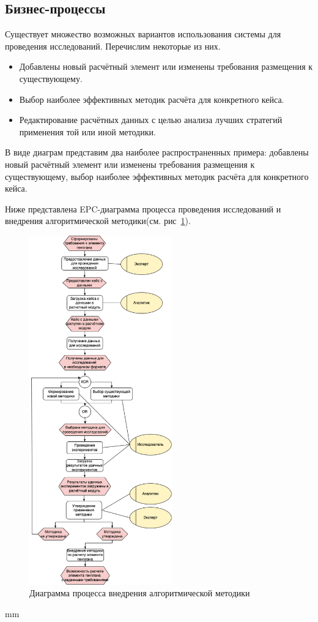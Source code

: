 \subsection{\Large{Бизнес-процессы}}

Существует множество возможных вариантов использования системы для проведения исследований.
Перечислим некоторые из них.
\begin{itemize}
	\item Добавлены новый расчётный элемент или изменены требования размещения к существующему.
	\item Выбор наиболее эффективных методик расчёта для конкретного кейса.
	\item Редактирование расчётных данных с целью анализа лучших стратегий применения той или иной методики.
\end{itemize}

В виде диаграм представим два наиболее распространенных примера: добавлены новый расчётный элемент
или изменены требования размещения к существующему, выбор наиболее эффективных методик расчёта для конкретного кейса.

Ниже представлена EPC-диаграмма процесса проведения исследований и
внедрения алгоритмической методики(см. рис\ \ref{pic:analysis__usecases-epc}).

\begin{figure}[H]
	\hspace*{-2.5 cm}\includegraphics[width=0.55\textwidth, left]{analysis/pictures/usecases/epc}
	\caption{Диаграмма процесса внедрения алгоритмической методики}
	\label{pic:analysis__usecases-epc}
\end{figure}
 mm


